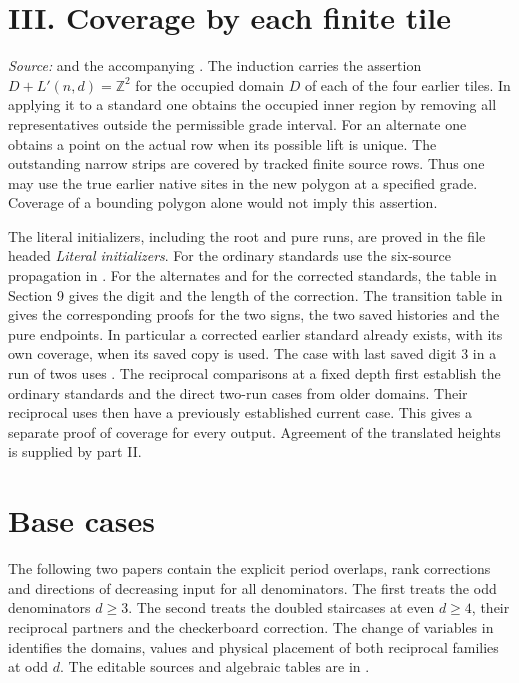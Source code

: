 \documentclass[11pt]{article}
\newcommand{\Z}{\mathbb Z}
\begin{document}
\section*{III. Coverage by each finite tile}
\noindent\emph{Source:}  and the accompanying . The induction carries the assertion $D+L'(n,d)=\Z^2$ for the occupied domain $D$ of each of the four earlier tiles. In applying it to a standard one obtains the occupied inner region by removing all representatives outside the permissible grade interval. For an alternate one obtains a point on the actual row when its possible lift is unique. The outstanding narrow strips are covered by tracked finite source rows. Thus one may use the true earlier native sites in the new polygon at a specified grade. Coverage of a bounding polygon alone would not imply this assertion.

The literal initializers, including the root and pure runs, are proved in the file headed \emph{Literal initializers}. For the ordinary standards use the six-source propagation in . For the alternates and for the corrected standards, the table in Section 9 gives the digit and the length of the correction. The transition table in  gives the corresponding proofs for the two signs, the two saved histories and the pure endpoints. In particular a corrected earlier standard already exists, with its own coverage, when its saved copy is used. The case with last saved digit $3$ in a run of twos uses . The reciprocal comparisons at a fixed depth first establish the ordinary standards and the direct two-run cases from older domains. Their reciprocal uses then have a previously established current case. This gives a separate proof of coverage for every output. Agreement of the translated heights is supplied by part II.

\section*{Base cases}
The following two papers contain the explicit period overlaps, rank corrections and directions of decreasing input for all denominators. The first treats the odd denominators $d\ge3$. The second treats the doubled staircases at even $d\ge4$, their reciprocal partners and the checkerboard correction. The change of variables in  identifies the domains, values and physical placement of both reciprocal families at odd $d$. The editable sources and algebraic tables are in .
\clearpage
{}


\end{document}
